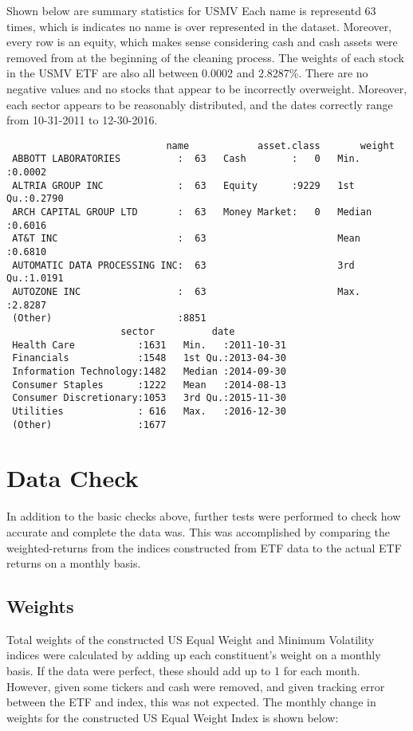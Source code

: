 \documentclass[12pt,twoside]{reedthesis}
\theoremstyle{definition}
\theoremstyle{definition}
\theoremstyle{definition}
\theoremstyle{remark}
\begin{document}
Shown below are summary statistics for USMV Each name is representd 63
times, which is indicates no name is over represented in the dataset.
Moreover, every row is an equity, which makes sense considering cash and
cash assets were removed from at the beginning of the cleaning process.
The weights of each stock in the USMV ETF are also all between 0.0002
and 2.8287\%. There are no negative values and no stocks that appear to
be incorrectly overweight. Moreover, each sector appears to be
reasonably distributed, and the dates correctly range from 10-31-2011 to
12-30-2016.
\begin{verbatim}
                            name            asset.class       weight      
 ABBOTT LABORATORIES          :  63   Cash        :   0   Min.   :0.0002  
 ALTRIA GROUP INC             :  63   Equity      :9229   1st Qu.:0.2790  
 ARCH CAPITAL GROUP LTD       :  63   Money Market:   0   Median :0.6016  
 AT&T INC                     :  63                       Mean   :0.6810  
 AUTOMATIC DATA PROCESSING INC:  63                       3rd Qu.:1.0191  
 AUTOZONE INC                 :  63                       Max.   :2.8287  
 (Other)                      :8851                                       
                    sector          date           
 Health Care           :1631   Min.   :2011-10-31  
 Financials            :1548   1st Qu.:2013-04-30  
 Information Technology:1482   Median :2014-09-30  
 Consumer Staples      :1222   Mean   :2014-08-13  
 Consumer Discretionary:1053   3rd Qu.:2015-11-30  
 Utilities             : 616   Max.   :2016-12-30  
 (Other)               :1677                       
\end{verbatim}
\section{Data Check}\label{data-check}

In addition to the basic checks above, further tests were performed to
check how accurate and complete the data was. This was accomplished by
comparing the weighted-returns from the indices constructed from ETF
data to the actual ETF returns on a monthly basis.

\subsection{Weights}\label{weights}

Total weights of the constructed US Equal Weight and Minimum Volatility
indices were calculated by adding up each constituent's weight on a
monthly basis. If the data were perfect, these should add up to 1 for
each month. However, given some tickers and cash were removed, and given
tracking error between the ETF and index, this was not expected. The
monthly change in weights for the constructed US Equal Weight Index is
shown below:
\end{document}
